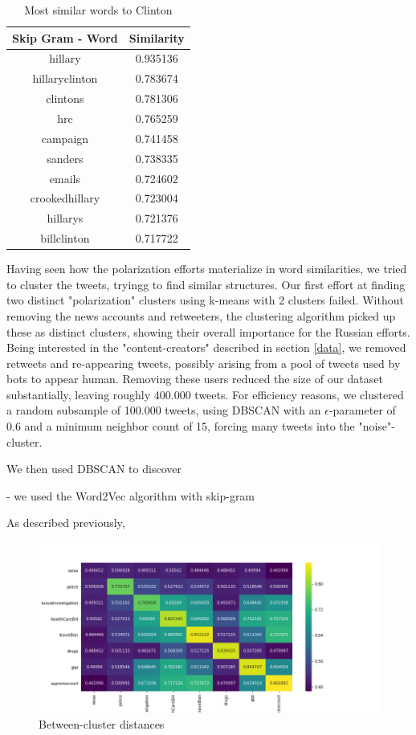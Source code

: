 \documentclass[12pt, authoryear]{elsarticle}
\begin{document}
\begin{center}
\begin{table}[H]
\begin{tabular}{ c c } 
Skip Gram - Word   &  Similarity \\
 \hline
hillary   &  0.935136\\
hillaryclinton   &  0.783674\\
clintons &    0.781306\\
hrc   &  0.765259\\
campaign  &   0.741458\\
sanders  &  0.738335\\
emails   &  0.724602\\
crookedhillary    & 0.723004\\
hillarys   &  0.721376\\
billclinton  &   0.717722\\
 \hline
\end{tabular}
\caption{Most similar words to Clinton}
\label{table:6}
\end{table}
\end{center}


Having seen how the polarization efforts materialize in word similarities, we tried to cluster the tweets, tryingg to find similar structures. Our first effort at finding two distinct "polarization" clusters using k-means with 2 clusters failed. Without removing the news accounts and retweeters, the clustering algorithm picked up these as distinct clusters, showing their overall importance for the Russian efforts. Being interested in the "content-creators" described in section \ref{data}, we removed retweets and re-appearing tweets, possibly arising from a pool of tweets used by bots to appear human. Removing these users reduced the size of our dataset substantially, leaving roughly 400.000 tweets. For efficiency reasons, we clustered a random subsample of 100.000 tweets, using DBSCAN with an $\epsilon$-parameter of 0.6 and a minimum neighbor count of 15, forcing many tweets into the "noise"-cluster. 


We then used DBSCAN to discover 

- we used the Word2Vec algorithm with skip-gram 

As described previously,



\begin{figure}[t]
\includegraphics[width=7in]{heatmap_cluster_similarity}
\centering
\caption{Between-cluster distances}
\label{distance:1}
\end{figure}
\end{document}
